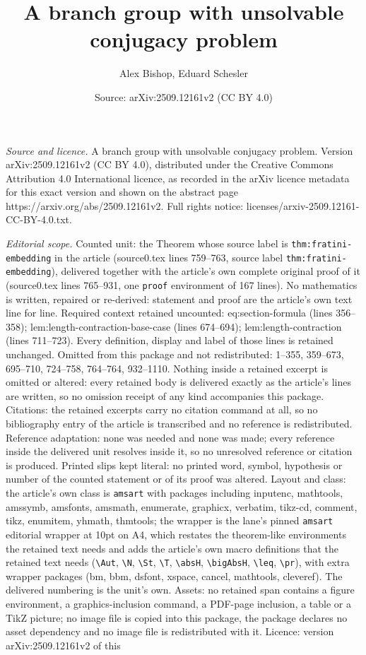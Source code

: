 \documentclass[10pt,a4paper]{amsart}
\title[A branch group with unsolvable conjugacy problem]{A branch group with unsolvable conjugacy problem}
\author{Alex Bishop, Eduard Schesler}
\date{Source: arXiv:2509.12161v2 (CC BY 4.0)}
\begin{document}
\maketitle

\noindent\emph{Source and licence.} A branch group with unsolvable conjugacy problem. Version arXiv:2509.12161v2 (CC BY 4.0), distributed under the Creative Commons Attribution 4.0 International licence, as recorded in the arXiv licence metadata for this exact version and shown on the abstract page https://arxiv.org/abs/2509.12161v2. Full rights notice: licenses/arxiv-2509.12161-CC-BY-4.0.txt.\par\smallskip

\noindent\textit{Editorial scope.} Counted unit: the Theorem whose source label is \texttt{thm:fratini-embedding} in the article (source0.tex lines 759--763, source label \texttt{thm:fratini-embedding}), delivered together with the article's own complete original proof of it (source0.tex lines 765--931, one \texttt{proof} environment of 167 lines). No mathematics is written, repaired or re-derived: statement and proof are the article's own text line for line. Required context retained uncounted: eq:section-formula (lines 356--358); lem:length-contraction-base-case (lines 674--694); lem:length-contraction (lines 711--723). Every definition, display and label of those lines is retained unchanged. Omitted from this package and not redistributed: 1--355, 359--673, 695--710, 724--758, 764--764, 932--1110. Nothing inside a retained excerpt is omitted or altered: every retained body is delivered exactly as the article's lines are written, so no omission receipt of any kind accompanies this package. Citations: the retained excerpts carry no citation command at all, so no bibliography entry of the article is transcribed and no reference is redistributed. Reference adaptation: none was needed and none was made; every reference inside the delivered unit resolves inside it, so no unresolved reference or citation is produced. Printed slips kept literal: no printed word, symbol, hypothesis or number of the counted statement or of its proof was altered. Layout and class: the article's own class is \texttt{amsart} with packages including inputenc, mathtools, amssymb, amsfonts, amsmath, enumerate, graphicx, verbatim, tikz-cd, comment, tikz, enumitem, yhmath, thmtools; the wrapper is the lane's pinned \texttt{amsart} editorial wrapper at 10pt on A4, which restates the theorem-like environments the retained text needs and adds the article's own macro definitions that the retained text needs (\texttt{\textbackslash Aut}, \texttt{\textbackslash N}, \texttt{\textbackslash St}, \texttt{\textbackslash T}, \texttt{\textbackslash absH}, \texttt{\textbackslash bigAbsH}, \texttt{\textbackslash leq}, \texttt{\textbackslash pr}), with extra wrapper packages (bm, bbm, dsfont, xspace, cancel, mathtools, cleveref). The delivered numbering is the unit's own. Assets: no retained span contains a figure environment, a graphics-inclusion command, a PDF-page inclusion, a table or a TikZ picture; no image file is copied into this package, the package declares no asset dependency and no image file is redistributed with it. Licence: version arXiv:2509.12161v2 of this 
\end{document}
